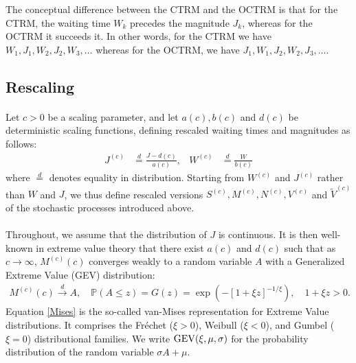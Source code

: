 \documentclass[12pt, a4paper]{article}
\newcommand{\PP}{\mathbb{P}}
\newcommand{\1}{\mathbf 1}
\begin{document}
The conceptual difference between the CTRM and the OCTRM is that for the CTRM, 
the waiting time $W_k$ precedes the magnitude $J_k$, whereas for 
the OCTRM it succeeds it. In other words, for the CTRM we have 
$W_1, J_1, W_2, J_2, W_3, \ldots$ whereas for the
OCTRM, we have $J_1, W_1, J_2, W_2, J_3, \ldots$. 


\subsection{Rescaling}

\paragraph{}
Let $c > 0$ be a scaling parameter, and let 
$a(c), b(c)$ and $d(c)$ be deterministic scaling functions,
defining rescaled waiting times and magnitudes as follows: 
\begin{align}
J^{(c)} &\stackrel{d}{=} \frac{J - d(c)}{a(c)}, 
& 
W^{(c)} &\stackrel{d}{=} \frac{W}{b(c)}
\end{align}
where $\stackrel{d}{=}$ denotes equality in distribution. 
Starting from $W^{(c)}$ and $J^{(c)}$ rather than $W$ and $J$, we thus define rescaled 
versions $S^{(c)}, M^{(c)}, N^{(c)}, V^{(c)}$ and $\tilde V^{(c)}$ of the 
stochastic processes introduced above. 

\paragraph{}
Throughout, we assume that the distribution of $J$ is continuous. 
It is then well-known in extreme value theory that there exist $a(c)$ and $d(c)$
such that as $c \to \infty$,
$M^{(c)}(c)$ converges weakly to a random variable $A$ with a
Generalized Extreme Value (GEV) distribution: 
\begin{align}
M^{(c)}(c) \stackrel{d}{\to} A,
\quad \PP(A \le z) = G(z) = \exp\left(-[1+\xi z]^{-1/\xi}\right), 
\quad 1 + \xi z > 0. \label{Mises}
\end{align}
Equation \eqref{Mises} is the so-called van-Mises representation for 
Extreme Value distributions. 
It comprises the Fr\'echet ($\xi>0$), Weibull ($\xi<0$),
and Gumbel ($\xi = 0$) distributional families. 
We write ${\rm GEV}(\xi, \mu, \sigma)$ for the probability 
distribution of the random variable $\sigma A + \mu$. 
\end{document}
